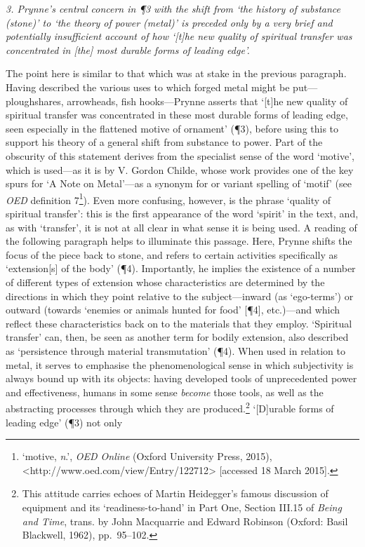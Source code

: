 \documentclass[]{article}
\begin{document}
\emph{3. Prynne’s central concern in ¶3 with the shift from ‘the history
of substance (stone)’ to ‘the theory of power (metal)’ is preceded only
by a very brief and potentially insufficient account of how ‘{[}t{]}he
new quality of spiritual transfer was concentrated in {[}the{]} most
durable forms of leading edge’.}

The point here is similar to that which was at stake in the previous
paragraph. Having described the various uses to which forged metal might
be put—ploughshares, arrowheads, fish hooks—Prynne asserts that
‘{[}t{]}he new quality of spiritual transfer was concentrated in these
most durable forms of leading edge, seen especially in the flattened
motive of ornament’ (¶3), before using this to support his theory of a
general shift from substance to power. Part of the obscurity of this
statement derives from the specialist sense of the word ‘motive’, which
is used—as it is by V. Gordon Childe, whose work provides one of the key
spurs for ‘A Note on Metal’—as a synonym for or variant spelling of
‘motif’ (see \emph{OED} definition 7\footnote{‘motive, \emph{n}.’,
  \emph{OED Online} (Oxford University Press, 2015),
  \textless{}http://www.oed.com/view/Entry/122712\textgreater{}
  {[}accessed 18 March 2015{]}.}). Even more confusing, however, is the
phrase ‘quality of spiritual transfer’: this is the first appearance of
the word ‘spirit’ in the text, and, as with ‘transfer’, it is not at all
clear in what sense it is being used. A reading of the following
paragraph helps to illuminate this passage. Here, Prynne shifts the
focus of the piece back to stone, and refers to certain activities
specifically as ‘extension{[}s{]} of the body’ (¶4). Importantly, he
implies the existence of a number of different types of extension whose
characteristics are determined by the directions in which they point
relative to the subject—inward (as ‘ego-terms’) or outward (towards
‘enemies or animals hunted for food’ {[}¶4{]}, etc.)—and which reflect
these characteristics back on to the materials that they employ.
‘Spiritual transfer’ can, then, be seen as another term for bodily
extension, also described as ‘persistence through material
transmutation’ (¶4). When used in relation to metal, it serves to
emphasise the phenomenological sense in which subjectivity is always
bound up with its objects: having developed tools of unprecedented power
and effectiveness, humans in some sense \emph{become} those tools, as
well as the abstracting processes through which they are
produced.\footnote{This attitude carries echoes of Martin Heidegger’s
  famous discussion of equipment and its ‘readiness-to-hand’ in Part
  One, Section III.15 of \emph{Being and Time}, trans. by John
  Macquarrie and Edward Robinson (Oxford: Basil Blackwell, 1962),
  pp.~95–102.} ‘{[}D{]}urable forms of leading edge’ (¶3) not only
\end{document}
